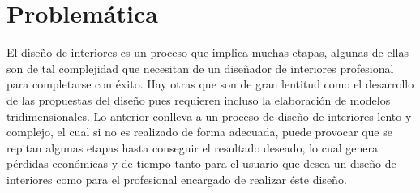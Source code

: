 \newpage
\section{Problemática}
El diseño de interiores es un proceso que implica muchas etapas, algunas de ellas son de tal complejidad que necesitan de un diseñador de interiores profesional para completarse con éxito. Hay otras que son de gran lentitud como el desarrollo de las propuestas del diseño pues requieren incluso la elaboración de modelos tridimensionales. Lo anterior conlleva a un proceso de diseño de interiores lento y complejo, el cual si no es realizado de forma adecuada, puede provocar que se repitan algunas etapas hasta conseguir el resultado deseado, lo cual genera pérdidas económicas y de tiempo tanto para el usuario que desea un diseño de interiores como para el profesional encargado de realizar éste diseño.

   